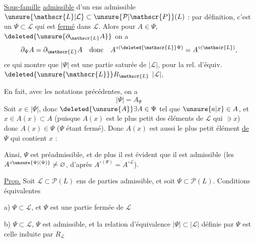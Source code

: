  \uline{Sous-famille}  \uline{admissible} d'un ens admissible $\unsure{\mathscr{L}|\mathcal{L}}\subset\unsure{\mathcal{P}|\mathscr{P}}(L)$ : par définition, c'est un $\Psi\subset\mathscr{L}$ qui est \uline{fermé} dans $\mathscr{L}$. Alors pour $A\in\Psi$, $\deleted{\unsure{\partial_{\mathscr{L}}A}}$ on a
\[
 \partial_{\Psi}A=\partial_{\mathscr{L}}A\quad\text{donc}\quad
 A^{\circ(\deleted{\mathscr{L}}\Psi)}=A^{\circ(\mathscr{L})},
\]
ce qui montre que $|\Psi|$ est une partie saturée de $|\mathscr{L}|$, pour la rel. d'équiv. $\deleted{\unsure{\mathscr{L}}}R_{\mathscr{L}}$  $|\mathscr{L}|$,

En fait, avec les notations précédentes, on a
\[
 |\Psi|=A_\Psi
\]
 Soit $x\in|\Psi|$, donc $\deleted{\unsure{A}}\exists A\in\Psi$ tel que $\unsure{a|x}\in A$,  et  $x\in A(x)\subset A$ (puisque $A(x)$ est le plus petit des éléments de $\mathscr{L}$ qui $\ni x$) donc $A(x)\in\Psi$ ($\Psi$ étant fermé). Donc $A(x)$ est aussi le plus petit élément \uline{de $\Psi$} qui contient $x$ :

 Ainsi, $\Psi$ est préadmissible, et de plus il est évident que il est admissible (les $A^{\circ\unsure{\Psi|(\Psi)}}\ne\varnothing$, d'après $A^{\circ(\Psi)}=A^{\circ\mathscr{L}}$).

\uline{Prop.} Soit $\mathscr{L}\subset\mathcal{P}(L)$ ens de parties admissible, et soit $\Psi\subset\mathcal{P}(L)$. Conditions équivalentes

a) $\Psi\subset\mathscr{L}$, et $\Psi$ est une partie fermée de $\mathscr{L}$

b) $\Psi\subset\mathscr{L}$, $\Psi$ est admissible,  et la relation d'équivalence   $|\Psi|\subset|\mathscr{L}|$ définie par $\Psi$ est celle induite par $R_{\mathscr{L}}$

